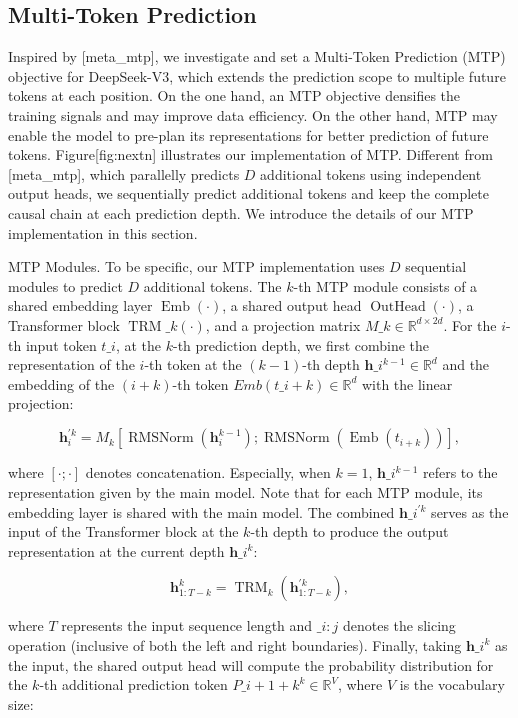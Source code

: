 \documentclass[11pt,a4paper]{article}
\begin{document}
\subsection{Multi-Token Prediction}

Inspired by [meta\_mtp], we investigate and set a Multi-Token Prediction (MTP) objective for DeepSeek-V3, which extends the prediction scope to multiple future tokens at each position.
On the one hand, an MTP objective densifies the training signals and may improve data efficiency.
On the other hand, MTP may enable the model to pre-plan its representations for better prediction of future tokens.
Figure[fig:nextn] illustrates our implementation of MTP.
Different from [meta\_mtp], which parallelly predicts $D$ additional tokens using independent output heads, we sequentially predict additional tokens and keep the complete causal chain at each prediction depth.
We introduce the details of our MTP implementation in this section.

MTP Modules.
To be specific, our MTP implementation uses $D$ sequential modules to predict $D$ additional tokens. 
The $k$-th MTP module consists of a shared embedding layer $\operatorname{Emb}(\cdot)$, a shared output head $\operatorname{OutHead}(\cdot)$, a Transformer block $\operatorname{TRM}\_k(\cdot)$, and a projection matrix $M\_k \in \mathbb{R}^{d \times 2d}$. 
For the $i$-th input token $t\_i$, at the $k$-th prediction depth, we first combine the representation of the $i$-th token at the $(k-1)$-th depth $\mathbf{h}\_i^{k-1} \in \mathbb{R}^{d}$ and the embedding of the $(i+k)$-th token $Emb(t\_{i+k}) \in \mathbb{R}^{d}$ with the linear projection:

$$\mathbf{h}_i^{\prime k} = M_k [\operatorname{RMSNorm}(\mathbf{h}_i^{k-1}) ; \operatorname{RMSNorm}(\operatorname{Emb}(t_{i+k}))],$$

where $[\cdot ; \cdot]$ denotes concatenation. 
Especially, when $k=1$, $\mathbf{h}\_i^{k-1}$ refers to the representation given by the main model.
Note that for each MTP module, its embedding layer is shared with the main model. 
The combined $\mathbf{h}\_i^{\prime k}$ serves as the input of the Transformer block at the $k$-th depth to produce the output representation at the current depth $\mathbf{h}\_{i}^{k}$:

$$\mathbf{h}_{1:T-k}^{k} = \operatorname{TRM}_k(\mathbf{h}_{1:T-k}^{\prime k}),$$

where $T$ represents the input sequence length and $\_{i:j}$ denotes the slicing operation (inclusive of both the left and right boundaries). 
Finally, taking $\mathbf{h}\_{i}^{k}$ as the input, the shared output head will compute the probability distribution for the $k$-th additional prediction token $P\_{i+1+k}^{k} \in \mathbb{R}^{V}$, where $V$ is the vocabulary size:
\end{document}
